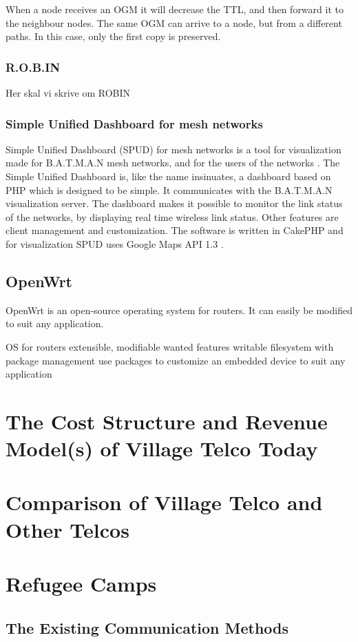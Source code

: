 When a node receives an OGM it will decrease the TTL, and then forward it to the neighbour nodes. The same OGM can arrive to a node, but from a different paths. In this case, only the first copy is preserved. 

\subsubsection{R.O.B.IN}
Her skal vi skrive om ROBIN

\subsubsection{Simple Unified Dashboard for mesh networks}
Simple Unified Dashboard (SPUD) for mesh networks is a tool for visualization made for B.A.T.M.A.N mesh networks, and for the users of the networks \cite{spud}. The Simple Unified Dashboard is, like the name insinuates, a dashboard based on PHP which is designed to be simple. It communicates with the B.A.T.M.A.N visualization server. The dashboard makes it possible to monitor the link status of the networks, by displaying real time wireless link status. Other features are client management and customization. The software is written in CakePHP and for visualization SPUD uses Google Maps API 1.3 \cite{spud}.


\subsection{OpenWrt}
OpenWrt is an open-source operating system for routers. It can easily be modified to suit any application. 

OS for routers
extensible, modifiable
wanted features
writable filesystem with package management 
use packages to customize an embedded device to suit any application

\section{The Cost Structure and Revenue Model(s) of Village Telco Today}

\section{Comparison of Village Telco and Other Telcos}

\section{Refugee Camps}
\subsection{The Existing Communication Methods}
